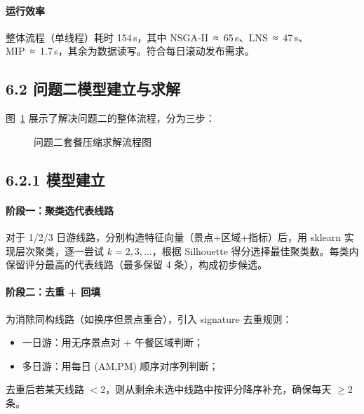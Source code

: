 \documentclass[12pt,a4paper]{article}
\begin{document}
\paragraph{运行效率}  
整体流程（单线程）耗时 154 s，其中 NSGA‑II ≈ 65 s、LNS ≈ 47 s、MIP ≈ 1.7 s，其余为数据读写。符合每日滚动发布需求。

\newpage
\subsection*{6.2 问题二模型建立与求解}

图~\ref{fig:flow2} 展示了解决问题二的整体流程，分为三步：

\begin{figure}[H]
\centering
{}
\caption{问题二套餐压缩求解流程图}\label{fig:flow2}
\end{figure}

\subsection*{6.2.1 模型建立}

\paragraph{阶段一：聚类选代表线路}
对于 1/2/3 日游线路，分别构造特征向量（景点+区域+指标）后，用 sklearn 实现层次聚类，逐一尝试 $k=2,3,\dots$，根据 Silhouette 得分选择最佳聚类数。每类内保留评分最高的代表线路（最多保留 4 条），构成初步候选。

\paragraph{阶段二：去重 + 回填}
为消除同构线路（如换序但景点重合），引入 signature 去重规则：
\begin{itemize}
    \item 一日游：用无序景点对 + 午餐区域判断；
    \item 多日游：用每日 (AM,PM) 顺序对序列判断；
\end{itemize}
去重后若某天线路 $<2$，则从剩余未选中线路中按评分降序补充，确保每天 $\ge2$ 条。
\end{document}
